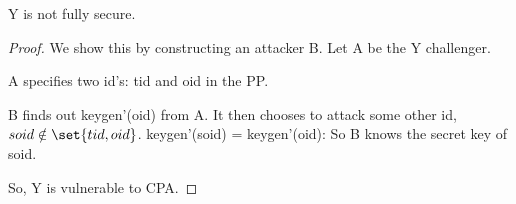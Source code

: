 \documentclass[10pt]{amsart}
\begin{document}
\begin{lem}
 Y is not fully secure.
\end{lem}
\begin{proof}
We show this by constructing an attacker B. Let A be the Y challenger.

A specifies two id's: tid and oid in the PP.

B finds out keygen'(oid) from A. It then chooses to attack some other id, $soid \notin \set{tid, oid}$. keygen'(soid) = keygen'(oid): So B knows the secret key of soid.

So, Y is vulnerable to CPA.

\end{proof}

% 
% 
\end{document}
